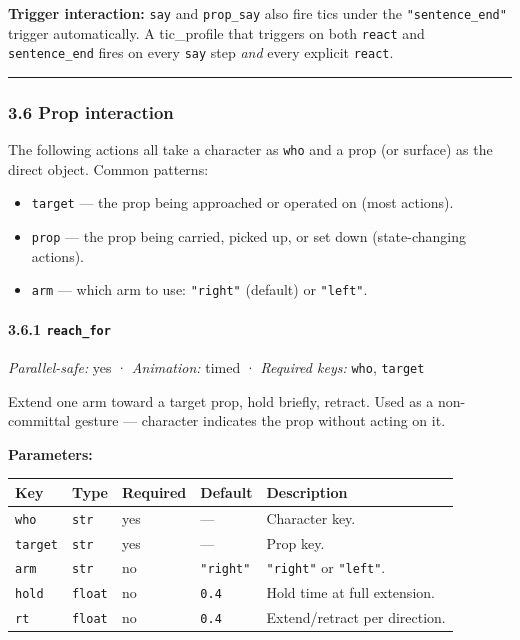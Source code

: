\documentclass[
  12pt,
  letterpaper,
]{book}
\providecommand{\tightlist}{%
  \setlength{\itemsep}{0pt}\setlength{\parskip}{0pt}}
\begin{document}
\textbf{Trigger interaction:} \texttt{say} and \texttt{prop\_say} also
fire tics under the \texttt{"sentence\_end"} trigger automatically. A
tic\_profile that triggers on both \texttt{react} and
\texttt{sentence\_end} fires on every \texttt{say} step \emph{and} every
explicit \texttt{react}.

\begin{center}\rule{0.5\linewidth}{0.5pt}\end{center}

\subsubsection{3.6 Prop interaction}\label{prop-interaction}

The following actions all take a character as \texttt{who} and a prop
(or surface) as the direct object. Common patterns:

\begin{itemize}
\tightlist
\item
  \texttt{target} --- the prop being approached or operated on (most
  actions).
\item
  \texttt{prop} --- the prop being carried, picked up, or set down
  (state-changing actions).
\item
  \texttt{arm} --- which arm to use: \texttt{"right"} (default) or
  \texttt{"left"}.
\end{itemize}

\paragraph{\texorpdfstring{3.6.1
\texttt{reach\_for}}{3.6.1 reach\_for}}\label{reach_for}

\emph{Parallel-safe:} yes · \emph{Animation:} timed · \emph{Required
keys:} \texttt{who}, \texttt{target}

Extend one arm toward a target prop, hold briefly, retract. Used as a
non-committal gesture --- character indicates the prop without acting on
it.

\textbf{Parameters:}

\begin{longtable}[]{@{}lllll@{}}
\toprule\noalign{}
Key & Type & Required & Default & Description \\
\midrule\noalign{}
\endhead
\bottomrule\noalign{}
\endlastfoot
\texttt{who} & \texttt{str} & yes & --- & Character key. \\
\texttt{target} & \texttt{str} & yes & --- & Prop key. \\
\texttt{arm} & \texttt{str} & no & \texttt{"right"} & \texttt{"right"}
or \texttt{"left"}. \\
\texttt{hold} & \texttt{float} & no & \texttt{0.4} & Hold time at full
extension. \\
\texttt{rt} & \texttt{float} & no & \texttt{0.4} & Extend/retract per
direction. \\
\end{longtable}
\end{document}
